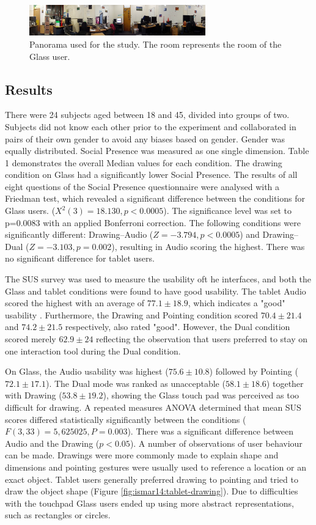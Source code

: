 \begin{figure}[ht]
	\centering
	\includegraphics[width=3in]{images/ismar14/envrionment-setup}
	\caption{Panorama used for the study. The room represents the room of the Glass user.}
	\label{fig:ismar14:envrionment-setup}
\end{figure}

\subsection{Results}

There were 24 subjects aged between 18 and 45, divided into groups of two. Subjects did not know each other prior to the experiment and collaborated in pairs of their own gender to avoid any biases based on gender. Gender was equally distributed. Social Presence was measured as one single dimension. Table 1 demonstrates the overall Median values for each condition. The drawing condition on Glass had a significantly lower Social Presence. The results of all eight questions of the Social Presence questionnaire were analysed with a Friedman test, which revealed a significant difference between the conditions for Glass users. ($X^2(3)=18.130, p<0.0005$). The significance level was set to p=0.0083 with an applied Bonferroni correction. The following conditions were significantly different: Drawing–Audio ($Z=-3.794, p<0.0005$) and Drawing–Dual ($Z=-3.103, p=0.002$), resulting in Audio scoring the highest. There was no significant difference for tablet users.

The SUS survey was used to measure the usability oft he interfaces, and both the Glass and tablet conditions were found to have good usability. The tablet Audio scored the highest with an average of $77.1\pm18.9$, which indicates a "good" usability \cite{Bangor2008}. Furthermore, the Drawing and Pointing condition scored $70.4\pm21.4$ and $74.2\pm21.5$ respectively, also rated "good". However, the Dual condition scored merely $62.9\pm24$ reflecting the observation that users preferred to stay on one interaction tool during the Dual condition.

On Glass, the Audio usability was highest ($75.6\pm10.8$) followed by Pointing ($72.1\pm17.1$). The Dual mode was ranked as unacceptable ($58.1\pm18.6$) together with Drawing ($53.8\pm19.2$), showing the Glass touch pad was perceived as too difficult for drawing. A repeated measures ANOVA determined that mean SUS scores differed statistically significantly between the conditions ($F(3, 33)=5,625025, P=0.003$). There was a significant difference between Audio and the Drawing ($p<0.05$). A number of observations of user behaviour can be made. Drawings were more commonly made to explain shape and dimensions and pointing gestures were usually used to reference a location or an exact object. Tablet users generally preferred drawing to pointing and tried to draw the object shape (Figure \ref{fig:ismar14:tablet-drawing}). Due to difficulties with the touchpad Glass users ended up using more abstract representations, such as rectangles or circles.

